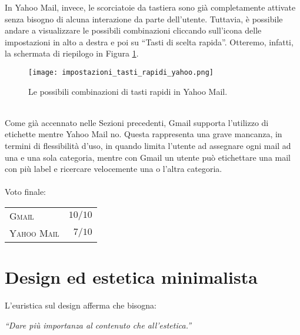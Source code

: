 		In Yahoo Mail, invece, le scorciatoie da tastiera sono già completamente attivate senza bisogno di alcuna interazione da parte dell'utente. Tuttavia, è possibile andare a visualizzare le possibili combinazioni cliccando sull'icona delle impostazioni in alto a destra e poi su ``Tasti di scelta rapida''. Otteremo, infatti, la schermata di riepilogo in Figura \ref{fig:impostazioni_tasti_rapidi_yahoo}.
		\begin{figure}[h!]
			\begin{center}
				\texttt{[image: impostazioni\_tasti\_rapidi\_yahoo.png]}
			\end{center}
			\caption[Impostazioni dei tasti rapidi in Yahoo Mail]{Le possibili combinazioni di tasti rapidi in Yahoo Mail.}
			\label{fig:impostazioni_tasti_rapidi_yahoo}
		\end{figure}
		\\
		
		Come già accennato nelle Sezioni precedenti, Gmail supporta l'utilizzo di etichette mentre Yahoo Mail no. Questa rappresenta una grave mancanza, in termini di flessibilità d'uso, in quando limita l'utente ad assegnare ogni mail ad una e una sola categoria, mentre con Gmail un utente può etichettare una mail con più label e ricercare velocemente una o l'altra categoria.\\
		\\
		Voto finale:
		
		\begin{flushleft}
			\begin{tabular}{lr}
				\textsc{Gmail} & $10/10$\\
				\textsc{Yahoo Mail} & $7/10$
			\end{tabular}
		\end{flushleft}
	
	\section{Design ed estetica minimalista} \label{sec:design_estetica_minimalista}
	
		L'euristica sul design afferma che bisogna:
		\begin{center}
			\begin{minipage}{0.7\textwidth}
				\textit{``Dare più importanza al contenuto che all'estetica.''}
			\end{minipage}
		\end{center}
	
